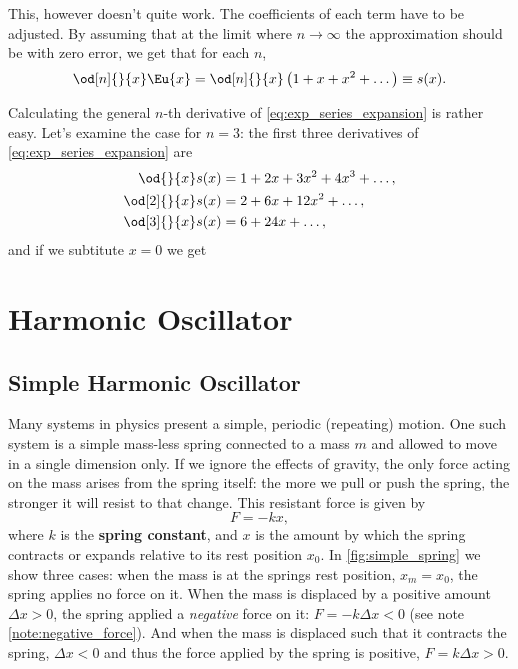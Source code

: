 This, however doesn't quite work. The coefficients of each term have to be adjusted. By assuming that at the limit where $n\to\infty$ the approximation should be with zero error, we get that for each $n$,
\begin{equation}
  \od[n]{}{x}\Eu{x} = \od[n]{}{x}\left(1+x+x^{2}+\dots\right) \equiv s(x).
  \label{eq:label}
\end{equation}

Calculating the general $n$-th derivative of \autoref{eq:exp_series_expansion} is rather easy. Let's examine the case for $n=3$: the first three derivatives of \autoref{eq:exp_series_expansion} are
\begin{align*}
  \od{}{x}s(x) &= 1 + 2x + 3x^{2} + 4x^{3} + \dots,\\
  \od[2]{}{x}s(x) &= 2 + 6x + 12x^{2} + \dots,\\
  \od[3]{}{x}s(x) &= 6 + 24x + \dots,
\end{align*}
and if we subtitute $x=0$ we get


\section{Harmonic Oscillator}
\subsection{Simple Harmonic Oscillator}
Many systems in physics present a simple, periodic (repeating) motion. One such system is a simple mass-less spring connected to a mass $m$ and allowed to move in a single dimension only. If we ignore the effects of gravity, the only force acting on the mass arises from the spring itself: the more we pull or push the spring, the stronger it will resist to that change. This resistant force is given by
\begin{equation}
  F = -kx,
  \label{eq:spring_force}
\end{equation}
where $k$ is the \textbf{spring constant}, and $x$ is the amount by which the spring contracts or expands relative to its rest position $x_{0}$. In \autoref{fig:simple_spring} we show three cases: when the mass is at the springs rest position, $x_{m}=x_{0}$, the spring applies no force on it. When the mass is displaced by a positive amount $\Delta x>0$, the spring applied a \textit{negative} force on it: $F=-k\Delta x<0$ (see note \autoref{note:negative_force}). And when the mass is displaced such that it contracts the spring, $\Delta x<0$ and thus the force applied by the spring is positive, $F=k\Delta x>0$.

